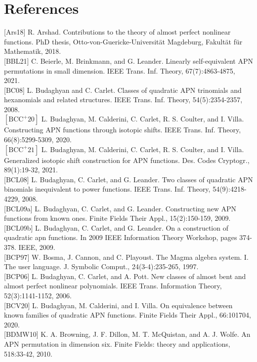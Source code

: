 \documentclass[10pt]{article}
\begin{document}
\section*{References}
[Ars18] R. Arshad. Contributions to the theory of almost perfect nonlinear functions. PhD thesis, Otto-von-Guericke-Universität Magdeburg, Fakultät für Mathematik, 2018.\\[0pt]
[BBL21] C. Beierle, M. Brinkmann, and G. Leander. Linearly self-equivalent APN permutations in small dimension. IEEE Trans. Inf. Theory, 67(7):4863-4875, 2021.\\[0pt]
[BC08] L. Budaghyan and C. Carlet. Classes of quadratic APN trinomials and hexanomials and related structures. IEEE Trans. Inf. Theory, 54(5):2354-2357, 2008.\\
$\left[\mathrm{BCC}^{+} 20\right]$ L. Budaghyan, M. Calderini, C. Carlet, R. S. Coulter, and I. Villa. Constructing APN functions through isotopic shifts. IEEE Trans. Inf. Theory, 66(8):5299-5309, 2020.\\
$\left[\mathrm{BCC}^{+} 21\right]$ L. Budaghyan, M. Calderini, C. Carlet, R. S. Coulter, and I. Villa. Generalized isotopic shift construction for APN functions. Des. Codes Cryptogr., 89(1):19-32, 2021.\\[0pt]
[BCL08] L. Budaghyan, C. Carlet, and G. Leander. Two classes of quadratic APN binomials inequivalent to power functions. IEEE Trans. Inf. Theory, 54(9):4218-4229, 2008.\\[0pt]
[BCL09a] L. Budaghyan, C. Carlet, and G. Leander. Constructing new APN functions from known ones. Finite Fields Their Appl., 15(2):150-159, 2009.\\[0pt]
[BCL09b] L. Budaghyan, C. Carlet, and G. Leander. On a construction of quadratic apn functions. In 2009 IEEE Information Theory Workshop, pages 374-378. IEEE, 2009.\\[0pt]
[BCP97] W. Bosma, J. Cannon, and C. Playoust. The Magma algebra system. I. The user language. J. Symbolic Comput., 24(3-4):235-265, 1997.\\[0pt]
[BCP06] L. Budaghyan, C. Carlet, and A. Pott. New classes of almost bent and almost perfect nonlinear polynomials. IEEE Trans. Information Theory, 52(3):1141-1152, 2006.\\[0pt]
[BCV20] L. Budaghyan, M. Calderini, and I. Villa. On equivalence between known families of quadratic APN functions. Finite Fields Their Appl., 66:101704, 2020.\\[0pt]
[BDMW10] K. A. Browning, J. F. Dillon, M. T. McQuistan, and A. J. Wolfe. An APN permutation in dimension six. Finite Fields: theory and applications, 518:33-42, 2010.\\[0pt]
\end{document}
